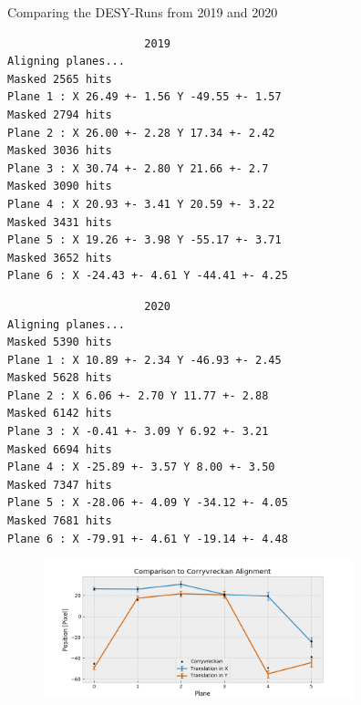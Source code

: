 \documentclass{beamer}
\begin{document}
\begin{frame}[fragile]{Comparing the DESY-Runs from 2019 and 2020}
    \begin{minipage}{.49\textwidth}
	\begin{lstlisting}
                     2019
Aligning planes...
Masked 2565 hits
Plane 1 : X 26.49 +- 1.56 Y -49.55 +- 1.57
Masked 2794 hits
Plane 2 : X 26.00 +- 2.28 Y 17.34 +- 2.42
Masked 3036 hits
Plane 3 : X 30.74 +- 2.80 Y 21.66 +- 2.7
Masked 3090 hits
Plane 4 : X 20.93 +- 3.41 Y 20.59 +- 3.22
Masked 3431 hits
Plane 5 : X 19.26 +- 3.98 Y -55.17 +- 3.71
Masked 3652 hits
Plane 6 : X -24.43 +- 4.61 Y -44.41 +- 4.25
\end{lstlisting}
    \end{minipage}
    \begin{minipage}{.49\textwidth}
	\begin{lstlisting}
                     2020
Aligning planes...
Masked 5390 hits
Plane 1 : X 10.89 +- 2.34 Y -46.93 +- 2.45
Masked 5628 hits
Plane 2 : X 6.06 +- 2.70 Y 11.77 +- 2.88
Masked 6142 hits
Plane 3 : X -0.41 +- 3.09 Y 6.92 +- 3.21
Masked 6694 hits
Plane 4 : X -25.89 +- 3.57 Y 8.00 +- 3.50
Masked 7347 hits
Plane 5 : X -28.06 +- 4.09 Y -34.12 +- 4.05
Masked 7681 hits
Plane 6 : X -79.91 +- 4.61 Y -19.14 +- 4.48
\end{lstlisting}
    \end{minipage}
    \pause
    \begin{figure}[H]
	\centering
	\includegraphics[trim=0 0 0 18,clip,width=9cm]{Corry.png}
    \end{figure}
\end{frame}
\end{document}
